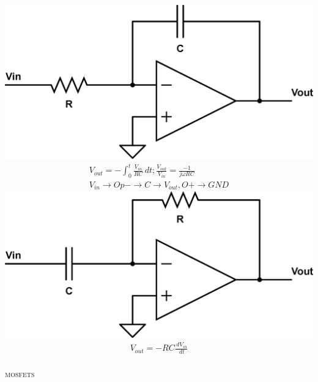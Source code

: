 \documentclass[10pt,letterpaper,english]{article}
\begin{document}
\begin{multicols}{2}
\includegraphics[scale=0.2]{opamp-integrator.eps}
\begin{align*}
V_{out} = -\int_0^t \frac{V_{in}}{RC} \,dt; \frac{V_{out}}{V_{in}} = \frac{-1}{j \omega RC} \tag*{Miller Integrator / Low-pass}\\
V_{in}\rightarrow Op- \rightarrow C \rightarrow V_{out}, O+ \rightarrow GND
\end{align*}
\includegraphics[scale=0.2]{opamp-differentiator.eps}
\begin{align*}
V_{out} = -RC \frac{\,dV_{in}}{\,dt} \tag*{Differentiator / High-pass}\\
\end{align*}
\end{multicols}


\textsc{mosfets}\\
\end{document}
